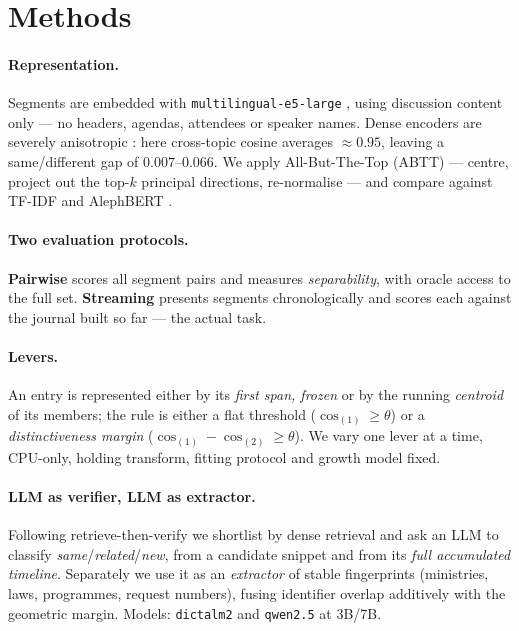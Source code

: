 \documentclass[11pt]{article}
\begin{document}
\section{Methods}

\paragraph{Representation.}
Segments are embedded with \texttt{multilingual-e5-large} \cite{wang2024multilinguale5},
using discussion content only --- no headers, agendas, attendees or speaker names. Dense
encoders are severely anisotropic \cite{ethayarajh2019contextual}: here cross-topic cosine
averages ${\approx}0.95$, leaving a same/different gap of $0.007$--$0.066$. We apply
All-But-The-Top (ABTT) \cite{mu2018allbutthetop} --- centre, project out the top-$k$
principal directions, re-normalise --- and compare against TF-IDF and AlephBERT
\cite{seker2022alephbert}.

\paragraph{Two evaluation protocols.}
\textbf{Pairwise} scores all segment pairs and measures \emph{separability}, with oracle
access to the full set. \textbf{Streaming} presents segments chronologically and scores each
against the journal built so far --- the actual task.

\paragraph{Levers.}
An entry is represented either by its \emph{first span, frozen} or by the running
\emph{centroid} of its members; the rule is either a flat threshold
($\cos_{(1)} \ge \theta$) or a \emph{distinctiveness margin}
($\cos_{(1)} - \cos_{(2)} \ge \theta$). We vary one lever at a time, CPU-only, holding
transform, fitting protocol and growth model fixed.

\paragraph{LLM as verifier, LLM as extractor.}
Following retrieve-then-verify we shortlist by dense retrieval and ask an LLM to classify
\emph{same}/\emph{related}/\emph{new}, from a candidate snippet and from its \emph{full
accumulated timeline}. Separately we use it as an \emph{extractor} of stable fingerprints
(ministries, laws, programmes, request numbers), fusing identifier overlap additively with
the geometric margin. Models: \texttt{dictalm2} \cite{shmidman2024dictalm} and
\texttt{qwen2.5} at 3B/7B.
\end{document}
